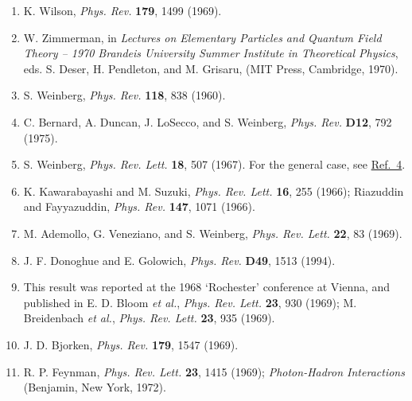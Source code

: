 
\begin{enumerate}
\item {}\label{ch20-ref-1}
K. Wilson, \emph{Phys. Rev.} \textbf{179}, 1499 (1969).

\item {}\label{ch20-ref-2}
W. Zimmerman, in \emph{Lectures on Elementary Particles and Quantum Field Theory -- 1970 Brandeis University Summer Institute in Theoretical Physics}, eds. S. Deser, H. Pendleton, and M. Grisaru, (MIT Press, Cambridge, 1970).

\item {}\label{ch20-ref-3}
S. Weinberg, \emph{Phys. Rev.} \textbf{118}, 838 (1960).

\item {}\label{ch20-ref-4}
C. Bernard, A. Duncan, J. LoSecco, and S. Weinberg, \emph{Phys. Rev.} \textbf{D12}, 792 (1975).

\item {}\label{ch20-ref-5}
S. Weinberg, \emph{Phys. Rev. Lett.} \textbf{18}, 507 (1967). For the general case, see \hyperref[ch20-ref-4]{Ref.~4}.

\item {}\label{ch20-ref-6}
K. Kawarabayashi and M. Suzuki, \emph{Phys. Rev. Lett.} \textbf{16}, 255 (1966); Riazuddin and Fayyazuddin, \emph{Phys. Rev.} \textbf{147}, 1071 (1966).

\item {}\label{ch20-ref-7}
M. Ademollo, G. Veneziano, and S. Weinberg, \emph{Phys. Rev. Lett.} \textbf{22}, 83 (1969).

\item {}\label{ch20-ref-8}
J. F. Donoghue and E. Golowich, \emph{Phys. Rev.} \textbf{D49}, 1513 (1994).

\item {}\label{ch20-ref-9}
This result was reported at the 1968 `Rochester' conference at Vienna, and published in E. D. Bloom \emph{et al.}, \emph{Phys. Rev. Lett.} \textbf{23}, 930 (1969); M. Breidenbach \emph{et al.}, \emph{Phys. Rev. Lett.} \textbf{23}, 935 (1969).

\item {}\label{ch20-ref-10}
J. D. Bjorken, \emph{Phys. Rev.} \textbf{179}, 1547 (1969).

\item {}\label{ch20-ref-11}
R. P. Feynman, \emph{Phys. Rev. Lett.} \textbf{23}, 1415 (1969); \emph{Photon-Hadron Interactions} (Benjamin, New York, 1972).


\end{enumerate}
